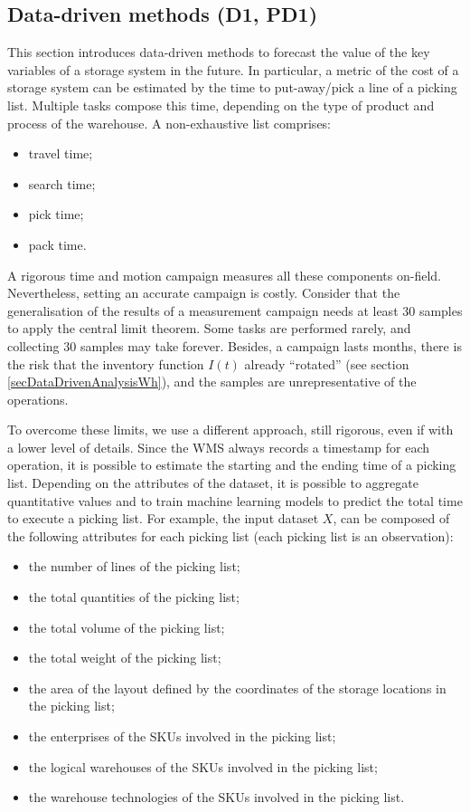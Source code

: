 \subsection{Data-driven methods (D1, PD1)}
This section introduces data-driven methods to forecast the value of the key variables of a storage system in the future. In particular, a metric of the cost of a storage system can be estimated by the time to put-away/pick a line of a picking list. Multiple tasks compose this time, depending on the type of product and process of the warehouse. A non-exhaustive list comprises:
\begin{itemize}
    \item travel time;
    \item search time;
    \item pick time;
    \item pack time.

\end{itemize}

A rigorous time and motion campaign measures all these components on-field. Nevertheless, setting an accurate campaign is costly. Consider that the generalisation of the results of a measurement campaign needs at least 30 samples to apply the central limit theorem. Some tasks are performed rarely, and collecting 30 samples may take forever. Besides, a campaign lasts months, there is the risk that the inventory function $I(t)$ already “rotated” (see section \ref{secDataDrivenAnalysisWh}), and the samples are unrepresentative of the operations. 

To overcome these limits, we use a different approach, still rigorous, even if with a lower level of details. Since the WMS always records a timestamp for each operation, it is possible to estimate the starting and the ending time of a picking list. Depending on the attributes of the dataset, it is possible to aggregate quantitative values and to train machine learning models to predict the total time to execute a picking list. For example, the input dataset $X$, can be composed of the following attributes for each picking list (each picking list is an observation):

\begin{itemize}
    \item the number of lines of the picking list;
    \item the total quantities of the picking list;
    \item the total volume of the picking list;
    \item the total weight of the picking list;
    \item the area of the layout defined by the coordinates of the storage locations in the picking list;
    \item the enterprises of the SKUs involved in the picking list;
    \item the logical warehouses of the SKUs involved in the picking list;
    \item the warehouse technologies of the SKUs involved in the picking list.

\end{itemize}

